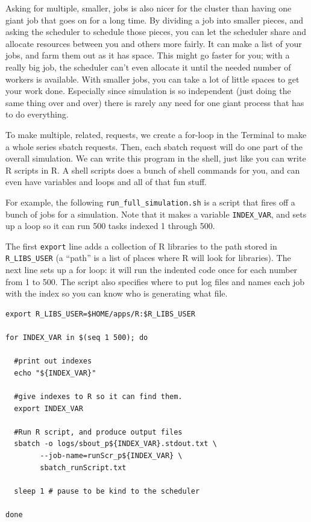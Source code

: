 \documentclass[
]{book}
\begin{document}
Asking for multiple, smaller, jobs is also nicer for the cluster than having one giant job that goes on for a long time.
By dividing a job into smaller pieces, and asking the scheduler to schedule those pieces, you can let the scheduler share and allocate resources between you and others more fairly.
It can make a list of your jobs, and farm them out as it has space.
This might go faster for you; with a really big job, the scheduler can't even allocate it until the needed number of workers is available.
With smaller jobs, you can take a lot of little spaces to get your work done.
Especially since simulation is so independent (just doing the same thing over and over) there is rarely any need for one giant process that has to do everything.

To make multiple, related, requests, we create a for-loop in the Terminal to make a whole series sbatch requests.
Then, each sbatch request will do one part of the overall simulation.
We can write this program in the shell, just like you can write R scripts in R.
A shell scripts does a bunch of shell commands for you, and can even have variables and loops and all of that fun stuff.

For example, the following \texttt{run\_full\_simulation.sh} is a script that fires off a bunch of jobs for a simulation.
Note that it makes a variable \texttt{INDEX\_VAR}, and sets up a loop so it can run 500 tasks indexed 1 through 500.

The first \texttt{export} line adds a collection of R libraries to the path stored in \texttt{R\_LIBS\_USER} (a ``path'' is a list of places where R will look for libraries).
The next line sets up a for loop: it will run the indented code once for each number from 1 to 500.
The script also specifies where to put log files and names each job with the index so you can know who is generating what file.

\begin{verbatim}
export R_LIBS_USER=$HOME/apps/R:$R_LIBS_USER

for INDEX_VAR in $(seq 1 500); do

  #print out indexes
  echo "${INDEX_VAR}"

  #give indexes to R so it can find them.
  export INDEX_VAR 

  #Run R script, and produce output files
  sbatch -o logs/sbout_p${INDEX_VAR}.stdout.txt \
        --job-name=runScr_p${INDEX_VAR} \
        sbatch_runScript.txt
  
  sleep 1 # pause to be kind to the scheduler

done
\end{verbatim}
\end{document}
